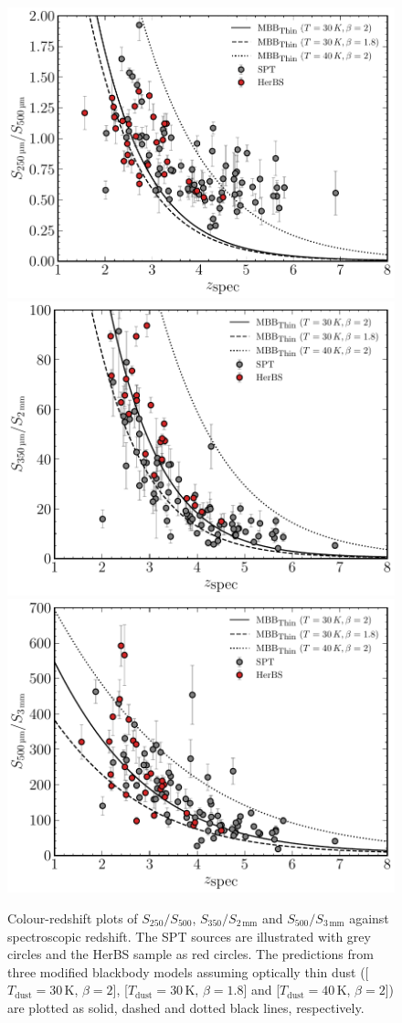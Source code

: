 \begin{figure}
    \centering
    \includegraphics[width=0.55\columnwidth,height=0.29\textheight]{Figures/Figure_4_3_part1.pdf}
    \includegraphics[width=0.55\columnwidth,height=0.29\textheight]{Figures/Figure_4_3_part2.pdf}
    \includegraphics[width=0.55\columnwidth,height=0.29\textheight]{Figures/Figure_4_3_part3.pdf}
    \caption[Colours of HerBS and SPT sources as a function of redshift]{Colour-redshift plots of $S_{250}/S_{500}$, $S_{350}/S_{2\,\textrm{mm}}$ and $S_{500}/S_{3\,\textrm{mm}}$ against spectroscopic redshift. The SPT sources are illustrated with grey circles and the HerBS sample as red circles. The predictions from three modified blackbody models assuming optically thin dust ([$T_{\textrm{dust}} = 30\,$K, $\beta = 2$], [$T_{\textrm{dust}} = 30\,$K, $\beta = 1.8$] and [$T_{\textrm{dust}} = 40\,$K, $\beta = 2$]) are plotted as solid, dashed and dotted black lines, respectively.}
    \label{fig:spt_herbs_colour_redshift}
\end{figure}

